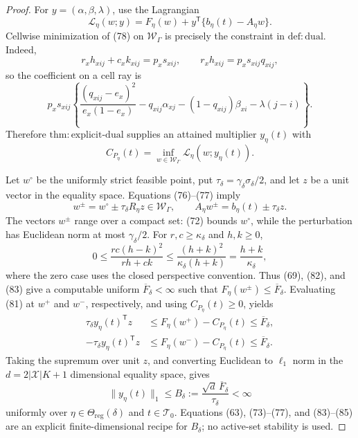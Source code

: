 \documentclass{article}
\begin{document}
\begin{proof}
For \(y=(\alpha,\beta,\lambda)\), use the Lagrangian
\[
\mathcal L_\eta(w;y)
=F_\eta(w)+y^{\mathsf T}\{b_\eta(t)-A_\eta w\}.
\tag{78}
\]
Cellwise minimization of (78) on \(\mathcal W_\Gamma\) is precisely the constraint in \(\mathrm{def{:}dual}\).  Indeed,
\[
r_xh_{xij}+c_xk_{xij}=p_xs_{xij},
\qquad
r_xh_{xij}=p_xs_{xij}q_{xij},
\tag{79}
\]
so the coefficient on a cell ray is
\[
p_xs_{xij}\left\{
\frac{(q_{xij}-e_x)^2}{e_x(1-e_x)}
-q_{xij}\alpha_{xj}-(1-q_{xij})\beta_{xi}
-\lambda(j-i)\right\}.
\tag{80}
\]
Therefore \(\mathrm{thm{:}explicit\mbox{-}dual}\) supplies an attained multiplier \(y_\eta(t)\) with
\[
C_{P_\eta}(t)
=\inf_{w\in\mathcal W_\Gamma}
\mathcal L_\eta(w;y_\eta(t)).
\tag{81}
\]

Let \(w^\circ\) be the uniformly strict feasible point, put
\(
\tau_\delta=\gamma_\delta\sigma_\delta/2
\), and let \(z\) be a unit vector in the equality space.  Equations (76)--(77) imply
\[
w^\pm=w^\circ\pm\tau_\delta R_\eta z\in\mathcal W_\Gamma,
\qquad
A_\eta w^\pm=b_\eta(t)\pm\tau_\delta z.
\tag{82}
\]
The vectors \(w^\pm\) range over a compact set: (72) bounds \(w^\circ\), while the perturbation has Euclidean norm at most \(\gamma_\delta/2\).  For \(r,c\geq\kappa_\delta\) and \(h,k\geq0\),
\[
0\leq\frac{rc(h-k)^2}{rh+ck}
\leq\frac{(h+k)^2}{\kappa_\delta(h+k)}
=\frac{h+k}{\kappa_\delta},
\tag{83}
\]
where the zero case uses the closed perspective convention.  Thus (69), (82), and (83) give a computable uniform \(\overline F_\delta<\infty\) such that \(F_\eta(w^\pm)\leq\overline F_\delta\).  Evaluating (81) at \(w^+\) and \(w^-\), respectively, and using \(C_{P_\eta}(t)\geq0\), yields
\[
\begin{aligned}
\tau_\delta y_\eta(t)^{\mathsf T}z
&\leq F_\eta(w^+)-C_{P_\eta}(t)\leq\overline F_\delta,\\
-\tau_\delta y_\eta(t)^{\mathsf T}z
&\leq F_\eta(w^-)-C_{P_\eta}(t)\leq\overline F_\delta.
\end{aligned}
\tag{84}
\]
Taking the supremum over unit \(z\), and converting Euclidean to \(\ell_1\) norm in the \(d=2|\mathcal X|K+1\) dimensional equality space, gives
\[
\|y_\eta(t)\|_1
\leq B_\delta
:=\frac{\sqrt d\,\overline F_\delta}{\tau_\delta}<\infty
\tag{85}
\]
uniformly over \(\eta\in\Theta_{\mathrm{reg}}(\delta)\) and \(t\in\mathcal T_0\).  Equations (63), (73)--(77), and (83)--(85) are an explicit finite-dimensional recipe for \(B_\delta\); no active-set stability is used.


\end{proof}
\end{document}
